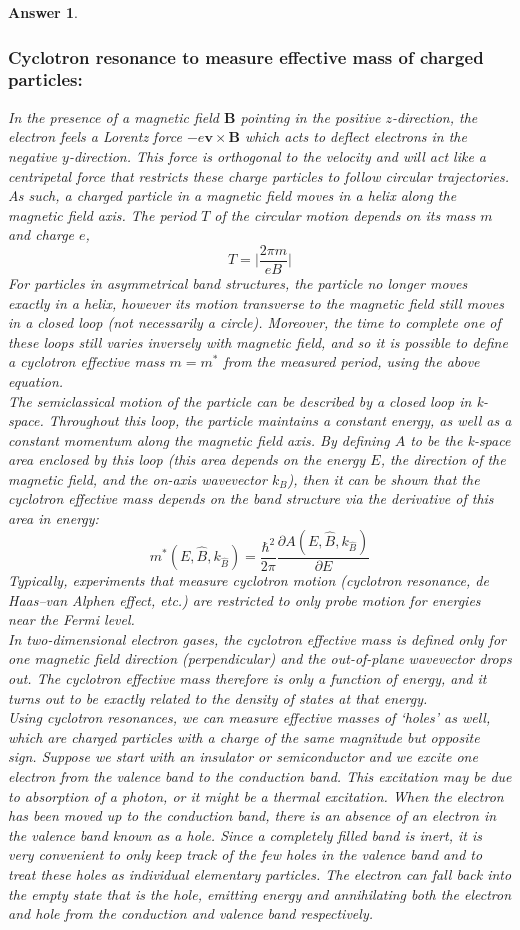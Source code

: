 \documentclass[a4paper]{article}
\newtheorem{ans}{Answer}[subsection]
\theoremstyle{new}
\begin{document}
\begin{ans}
\subsubsection*{Cyclotron resonance to measure effective mass of charged particles:}
In the presence of a magnetic field $\mathbf{B}$ pointing in the positive $z$-direction, the electron feels a  Lorentz force $-e\mathbf{v}\times\mathbf{B}$ which acts to deflect electrons in the negative $y$-direction. This force is orthogonal to the velocity and will act like a centripetal force that restricts these charge particles to follow circular trajectories. As such, a charged particle in a magnetic field moves in a helix along the magnetic field axis. The period $T$ of the circular motion depends on its mass $m$ and charge $e$,
$$T=\bigg|\frac{2\pi m}{eB}\bigg|$$
For particles in asymmetrical band structures, the particle no longer moves exactly in a helix, however its motion transverse to the magnetic field still moves in a closed loop (not necessarily a circle). Moreover, the time to complete one of these loops still varies inversely with magnetic field, and so it is possible to define a cyclotron effective mass $m=m^*$ from the measured period, using the above equation.\\[5pt]
The semiclassical motion of the particle can be described by a closed loop in k-space. Throughout this loop, the particle maintains a constant energy, as well as a constant momentum along the magnetic field axis. By defining $A$ to be the k-space area enclosed by this loop (this area depends on the energy $E$, the direction of the magnetic field, and the on-axis wavevector $k_B$), then it can be shown that the cyclotron effective mass depends on the band structure via the derivative of this area in energy:
$$m^*(E,\hat{B},k_{\hat{B}})=\frac{\hbar^2}{2\pi}\frac{\partial A(E,\hat{B},k_{\hat{B}})}{\partial E}$$
Typically, experiments that measure cyclotron motion (cyclotron resonance, de Haas–van Alphen effect, etc.) are restricted to only probe motion for energies near the Fermi level.\\[5pt]
In two-dimensional electron gases, the cyclotron effective mass is defined only for one magnetic field direction (perpendicular) and the out-of-plane wavevector drops out. The cyclotron effective mass therefore is only a function of energy, and it turns out to be exactly related to the density of states at that energy.\\[5pt]
Using cyclotron resonances, we can measure effective masses of `holes' as well, which are charged particles with a charge of the same magnitude but opposite sign. Suppose we start with an insulator or semiconductor and we excite one electron from the valence band to the conduction band. This excitation may be due to absorption of a photon, or it might be a thermal excitation. When the electron has been moved up to the conduction band, there is an absence of an electron in the valence band known as a hole. Since a completely filled band is inert, it is very convenient to only keep track of the few holes in the valence band and to treat these holes as individual elementary particles. The electron can fall back into the empty state that is the hole, emitting energy and annihilating both the electron and hole from the conduction and valence band respectively. 

\end{ans}
\end{document}
